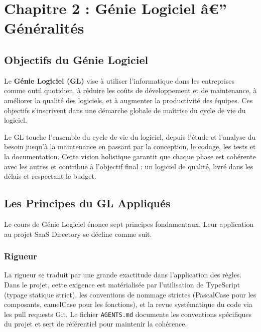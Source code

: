 
\section{Chapitre 2 : Génie Logiciel â€” Généralités}



\subsection{Objectifs du Génie Logiciel}



Le \textbf{Génie Logiciel (GL)} vise à utiliser l'informatique dans les entreprises comme outil quotidien, à réduire les coûts de développement et de maintenance, à améliorer la qualité des logiciels, et à augmenter la productivité des équipes. Ces objectifs s'inscrivent dans une démarche globale de maîtrise du cycle de vie du logiciel.



Le GL touche l'ensemble du cycle de vie du logiciel, depuis l'étude et l'analyse du besoin jusqu'à la maintenance en passant par la conception, le codage, les tests et la documentation. Cette vision holistique garantit que chaque phase est cohérente avec les autres et contribue à l'objectif final : un logiciel de qualité, livré dans les délais et respectant le budget.



\subsection{Les Principes du GL Appliqués}



Le cours de Génie Logiciel énonce sept principes fondamentaux. Leur application au projet SaaS Directory se décline comme suit.



\subsubsection{Rigueur}



La rigueur se traduit par une grande exactitude dans l'application des règles. Dans le projet, cette exigence est matérialisée par l'utilisation de TypeScript (typage statique strict), les conventions de nommage strictes (PascalCase pour les composants, camelCase pour les fonctions), et la revue systématique du code via les pull requests Git. Le fichier \texttt{AGENTS.md} documente les conventions spécifiques du projet et sert de référentiel pour maintenir la cohérence.



